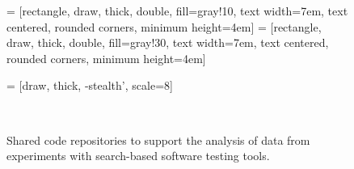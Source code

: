 
\begin{figure*}

  \begin{center}


     = [rectangle, draw, thick, double, fill=gray!10, text width=7em, text centered, rounded corners, minimum height=4em]
     = [rectangle, draw, thick, double, fill=gray!30, text width=7em, text centered, rounded corners, minimum height=4em]


     = [draw, thick, -stealth', scale=8]


  \end{center}

  \caption{Shared code repositories to support the analysis of data from experiments with search-based software testing
  tools.}~\label{fig:statistical_repositories}

\end{figure*}
